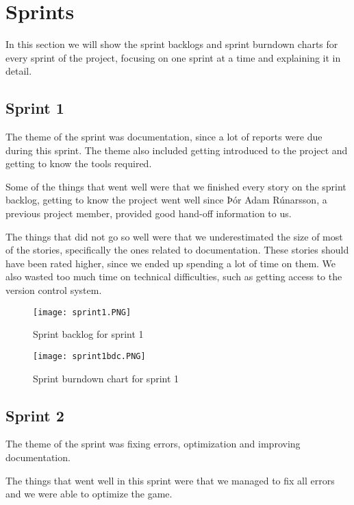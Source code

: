 \section{Sprints}\label{sec:sprints}

In this section we will show the sprint backlogs and sprint burndown charts for every sprint of the project, focusing on one sprint at a time and explaining it in detail.

\subsection{Sprint 1}

The theme of the sprint was documentation, since a lot of reports were due during this sprint. The theme also included getting introduced to the project and getting to know the tools required.

Some of the things that went well were that we finished every story on the sprint backlog, getting to know the project went well since Þór Adam Rúnarsson, a previous project member, provided good hand-off information to us.

The things that did not go so well were that we underestimated the size of most of the stories, specifically the ones related to documentation. These stories should have been rated higher, since we ended up spending a lot of time on them. We also wasted too much time on technical difficulties, such as getting access to the version control system. 


\begin{figure}[H]
	\centering
	\graphicspath{ {./graphics/} }
    \centerline{\texttt{[image: sprint1.PNG]}}
    \caption{\label{fig:s1}Sprint backlog for sprint 1}
\end{figure}

\begin{figure}[H]
	\centering
	\graphicspath{ {./graphics/} }
    \centerline{\texttt{[image: sprint1bdc.PNG]}}
    \caption{\label{fig:s1bd}Sprint burndown chart for sprint 1}
\end{figure}

\subsection{Sprint 2}
The theme of the sprint was fixing errors, optimization and improving documentation.

The things that went well in this sprint were that we managed to fix all errors and we were able to optimize the game. 

